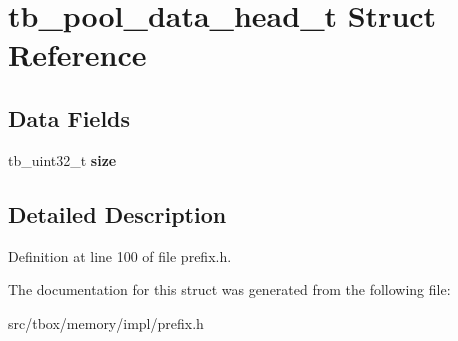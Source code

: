 \hypertarget{structtb__pool__data__head__t}{\section{tb\-\_\-pool\-\_\-data\-\_\-head\-\_\-t Struct Reference}
\label{structtb__pool__data__head__t}
}
\subsection*{Data Fields}
\begin{DoxyCompactItemize}
\item 
\hypertarget{structtb__pool__data__head__t_a1e846e45d88c04c78242ce51f06ba8d5}{tb\-\_\-uint32\-\_\-t {\bfseries size}}\label{structtb__pool__data__head__t_a1e846e45d88c04c78242ce51f06ba8d5}

\end{DoxyCompactItemize}


\subsection{Detailed Description}


Definition at line 100 of file prefix.\-h.



The documentation for this struct was generated from the following file\-:\begin{DoxyCompactItemize}
\item 
src/tbox/memory/impl/prefix.\-h\end{DoxyCompactItemize}
